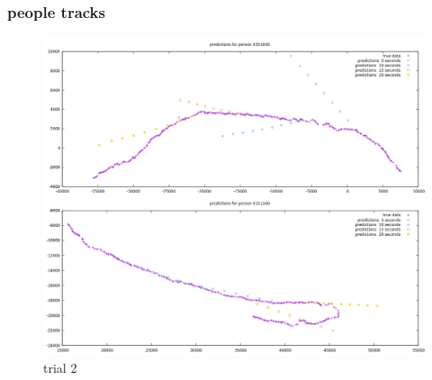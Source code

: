 \documentclass[10pt,a4paper]{article}
\begin{document}
\subsubsection{people tracks}
\begin{figure}[H]
\caption{trial 2} 
\includegraphics[width=\textwidth]{../graphs/person_tracks_2.png}
\end{figure}
\end{document}
